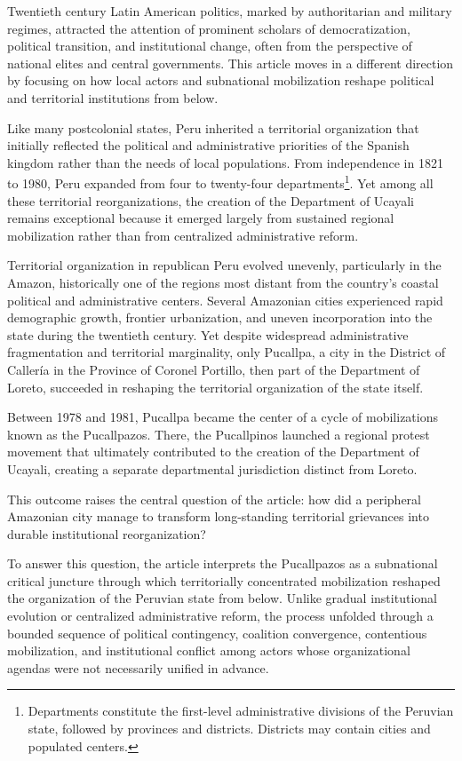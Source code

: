 \documentclass[12pt]{article}
\begin{document}
Twentieth century Latin American politics, marked by authoritarian and military regimes, attracted the attention of prominent scholars of democratization, political transition, and institutional change, often from the perspective of national elites and central governments. This article moves in a different direction by focusing on how local actors and subnational mobilization reshape political and territorial institutions from below.

Like many postcolonial states, Peru inherited a territorial organization that initially reflected the political and administrative priorities of the Spanish kingdom rather than the needs of local populations. From independence in 1821 to 1980, Peru expanded from four to twenty-four departments\footnote{Departments constitute the first-level administrative divisions of the Peruvian state, followed by provinces and districts. Districts may contain cities and populated centers.}. Yet among all these territorial reorganizations, the creation of the Department of Ucayali remains exceptional because it emerged largely from sustained regional mobilization rather than from centralized administrative reform.

Territorial organization in republican Peru evolved unevenly, particularly in the Amazon, historically one of the regions most distant from the country's coastal political and administrative centers. Several Amazonian cities experienced rapid demographic growth, frontier urbanization, and uneven incorporation into the state during the twentieth century. Yet despite widespread administrative fragmentation and territorial marginality, only Pucallpa, a city in the District of Callería in the Province of Coronel Portillo, then part of the Department of Loreto, succeeded in reshaping the territorial organization of the state itself.

Between 1978 and 1981, Pucallpa became the center of a cycle of mobilizations known as the Pucallpazos. There, the Pucallpinos launched a regional protest movement that ultimately contributed to the creation of the Department of Ucayali, creating a separate departmental jurisdiction distinct from Loreto.

This outcome raises the central question of the article: how did a peripheral Amazonian city manage to transform long-standing territorial grievances into durable institutional reorganization?

To answer this question, the article interprets the Pucallpazos as a subnational critical juncture through which territorially concentrated mobilization reshaped the organization of the Peruvian state from below. Unlike gradual institutional evolution or centralized administrative reform, the process unfolded through a bounded sequence of political contingency, coalition convergence, contentious mobilization, and institutional conflict among actors whose organizational agendas were not necessarily unified in advance.
\end{document}
